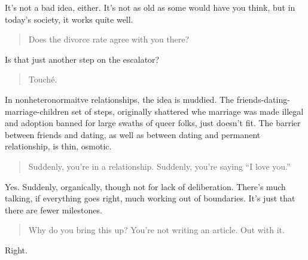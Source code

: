 It's not a bad idea, either. It's not as old as some would have you think, but in today's society, it works quite well.

\begin{quote}
Does the divorce rate agree with you there?
\end{quote}

Is that just another step on the escalator?

\begin{quote}
Touché.
\end{quote}

In nonheteronormaitve relationships, the idea is muddied. The friends-dating-marriage-children set of steps, originally shattered whe marriage was made illegal and adoption banned for large swaths of queer folks, just doesn't fit. The barrier between friends and dating, as well as between dating and permanent relationship, is thin, osmotic.

\begin{quote}
Suddenly, you're in a relationship. Suddenly, you're saying ``I love you.''
\end{quote}

Yes. Suddenly, organically, though not for lack of deliberation. There's much talking, if everything goes right, much working out of boundaries. It's just that there are fewer milestones.

\begin{quote}
Why do you bring this up? You're not writing an article. Out with it.
\end{quote}

Right.

